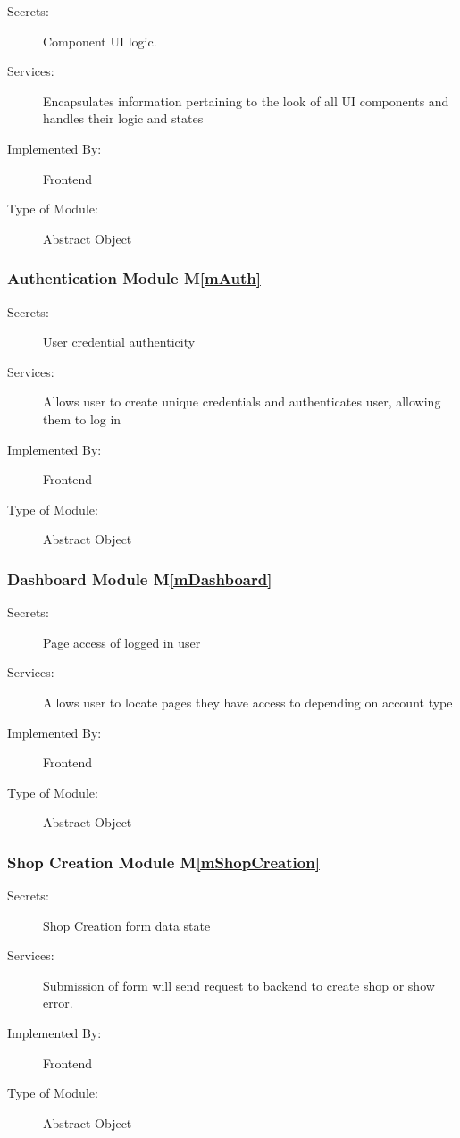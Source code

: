 \documentclass[12pt, titlepage]{article}
\newcommand{\mref}[1]{M\ref{#1}}
\begin{document}
\begin{description}
\item[Secrets:] Component UI logic.
\item[Services:] Encapsulates information pertaining to the look of all UI components and handles their logic and states
\item[Implemented By:] Frontend
\item[Type of Module:] Abstract Object
\end{description}

\subsubsection{Authentication Module \mref{mAuth}}

\begin{description}
\item[Secrets:]User credential authenticity
\item[Services:]Allows user to create unique credentials and authenticates user, allowing them to log in
\item[Implemented By:] Frontend
\item[Type of Module:] Abstract Object
\end{description}

\subsubsection{Dashboard Module \mref{mDashboard}}

\begin{description}
\item[Secrets:]Page access of logged in user
\item[Services:]Allows user to locate pages they have access to depending on account type
\item[Implemented By:] Frontend
\item[Type of Module:] Abstract Object
\end{description}

\subsubsection{Shop Creation Module \mref{mShopCreation}}

\begin{description}
\item[Secrets:]Shop Creation form data state
\item[Services:]Submission of form will send request to backend to create shop or show error.
\item[Implemented By:] Frontend
\item[Type of Module:] Abstract Object
\end{description}
\end{document}
